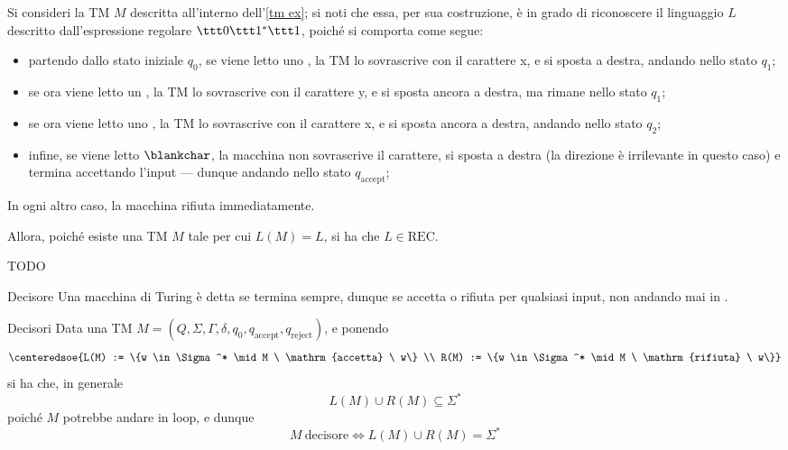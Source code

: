 \documentclass[a4paper, 12pt]{report}
\begin{document}
    \begin{example}
        Si consideri la TM $M$ descritta all'interno dell'\cref{tm ex}; si noti che essa, per sua costruzione, è in grado di riconoscere il linguaggio $L$ descritto dall'espressione regolare $\ttt 0 \ttt 1^* \ttt 1$, poiché si comporta come segue:

        \begin{itemize}
            \item partendo dallo stato iniziale $q_0$, se viene letto uno , la TM lo sovrascrive con il carattere \ttt x, e si sposta a destra, andando nello stato $q_1$;
            \item se ora viene letto un , la TM lo sovrascrive con il carattere \ttt y, e si sposta ancora a destra, ma rimane nello stato $q_1$;
            \item se ora viene letto uno , la TM lo sovrascrive con il carattere \ttt x, e si sposta ancora a destra, andando nello stato $q_2$;
            \item infine, se viene letto $\blankchar$, la macchina non sovrascrive il carattere, si sposta a destra (la direzione è irrilevante in questo caso) e termina accettando l'input --- dunque andando nello stato $q_\mathrm{accept}$;
        \end{itemize}

        In ogni altro caso, la macchina rifiuta immediatamente.

        Allora, poiché esiste una TM $M$ tale per cui $L(M) = L$, si ha che $L \in \mathrm{REC}$.
    \end{example}

    \begin{example}
        TODO
    \end{example}

    \begin{frameddefn}{Decisore}
        Una macchina di Turing è detta  se termina sempre, dunque se accetta o rifiuta per qualsiasi input, non andando mai in .
    \end{frameddefn}

    \begin{framedobs}{Decisori}
        Data una TM $M = (Q, \Sigma, \Gamma, \delta, q_0, q_\mathrm{accept}, q_\mathrm{reject})$, e ponendo $$\centeredsoe{L(M) := \{w \in \Sigma^* \mid M \ \mathrm{accetta} \ w\} \\ R(M) := \{w \in \Sigma^* \mid M \ \mathrm{rifiuta} \ w\}}$$ si ha che, in generale $$L(M) \cup R(M) \subseteq \Sigma^*$$ poiché $M$ potrebbe andare in loop, e dunque $$M \ \mathrm{decisore} \iff L(M) \cup R(M) = \Sigma^*$$
    \end{framedobs}
\end{document}

